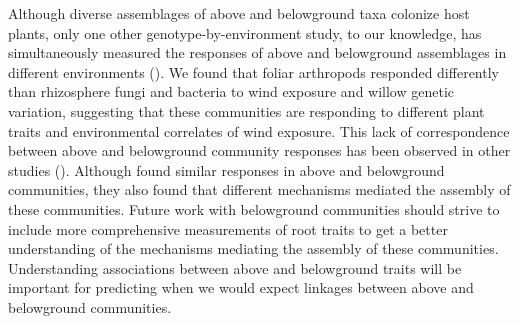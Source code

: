 \documentclass[11pt]{article}
\begin{document}
Although diverse assemblages of above and belowground taxa colonize host plants, only one other genotype-by-environment study, to our knowledge, has simultaneously measured the responses of above and belowground assemblages in different environments (\citealt{wagner2016host}). We found that foliar arthropods responded differently than
rhizosphere fungi and bacteria to wind exposure and willow genetic
variation, suggesting that these communities are responding to different plant traits and environmental correlates of wind exposure. This lack of correspondence between above and belowground community responses has been observed in other studies (\citealt{wagner2016host,Lamit_2015}). Although \cite{Crutsinger_2014} found similar responses in above and belowground communities, they also found that different mechanisms mediated the assembly of these communities. Future work with belowground communities should strive to include more comprehensive measurements of root traits to get a better understanding of the mechanisms mediating the assembly of these communities. Understanding associations between above and belowground traits will be important for predicting when we would expect linkages between
above and belowground communities.










\end{document}
